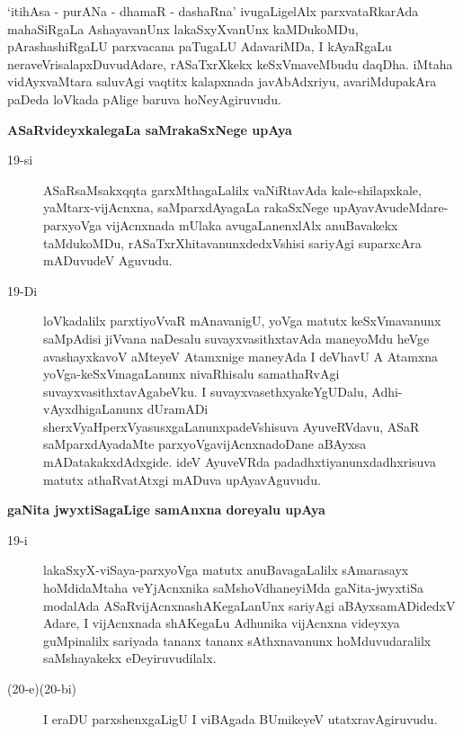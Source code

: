 \noindent
`itihAsa - purANa - dhamaR - dashaRna' ivugaLigelAlx parxvataRkarAda mahaSiRgaLa Ashaya\-vanUnx lakaSxyX\-vanUnx kaMDukoMDu, pArashashiRgaLU parxvacana paTugaLU AdavariMDa, I kAyaRgaLu neraveVrisa\-lapxDu\-vu\-dAdare, rASaTxrXkekx keSxVmaveMbudu daqDha. iMtaha vidAyxvaMtara saluvAgi vaqtitx kalapxnada javA\-bAdx\-riyu, avariMdupakAra paDeda loVkada pAlige baruva hoNeyAgiruvudu.

{\bigskip
\noindent
{\large\bf ASaRvideyxkalegaLa saMrakaSxNege upAya}}\label{page50}
\begin{description}
\item[19-si] ASaRsaMsakxqqta garxMthagaLalilx vaNiRtavAda kale-shilapxkale, yaMtarx-vijAcnxna, saMparxdAyagaLa rakaSx\-Nege upAyavAvudeMdare-parxyoVga vijAcnxnada mUlaka avugaLanenxlAlx anuBavakekx taMdu\-koMDu, rASaTxrXhitavanunxdedxVshisi sariyAgi suparxcAra mADuvudeV Aguvudu.

\item[19-Di] loVkadalilx parxtiyoVvaR mAnavanigU, yoVga matutx keSxVmavanunx saMpA\-disi jiVvana naDe\-salu suvayxvasithxtavAda maneyoMdu heVge avashayxkavoV aMteyeV Atamxnige maneyAda I deVhavU A Atamxna yoVga-keSxVma\-gaLanunx nivaRhisalu samathaRvAgi suvayxvasithxtavAgabeVku. I suvayxva\-sethxya\break keY\-gUDalu, Adhi-vAyxdhigaLanunx dUramADi sherxVyaHperxVyasusxgaLanunxpa\-deVshi\-suva Ayu\-veRVdavu, ASaR saMparxdAyadaMte parxyoVgavijAcnxnadoDane aBAyxsa mADatakakxdAdxgide. ideV AyuveVRda padadhxtiyanunxdadhxrisuva matutx athaRvatAtxgi mADuva upAyavAguvudu.
\end{description}

\newpage

{\bigskip
\noindent
{\large\bf gaNita jwyxtiSagaLige samAnxna doreyalu upAya}}\label{page51}
\begin{description}
\item[19-i] lakaSxyX-viSaya-parxyoVga matutx anuBavagaLalilx sAmarasayx hoMdidaMtaha veYjAcnxnika saMshoV\-dhaneyiMda gaNita-jwyxtiSa modalAda \hbox{ASaRvijAcnxna}\break shAKegaLanUnx sariyAgi aBAyxsamADidedxV Adare, I vijAcnxnada shAKegaLu Adhunika vijAcnxna videyxya guMpinalilx sariyada tananx tananx sAthxnavanunx hoMdu\-vudaralilx saMshayakekx eDeyiruvudilalx.

\item[(20-e)(20-bi)] I eraDU parxshenxgaLigU I viBAgada BUmikeyeV utatxra\-vAgiruvudu.
\end{description}


